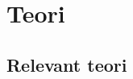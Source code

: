 \section{Teori}

\subsection{Relevant teori}

\parencite{datatilsynet_personvern}\\
\parencite{regjeringen_personvern}\\
\parencite{regjeringen_gdpr}\\
\parencite{regjeringen_nylov}\\
\parencite{test}\\

\newpage